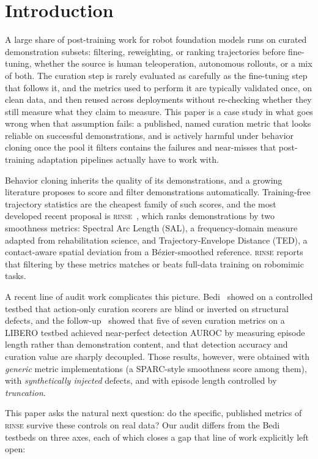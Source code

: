 \documentclass{article}
\newcommand{\rinse}{\textsc{rinse}}
\begin{document}
\section{Introduction}

A large share of post-training work for robot foundation models runs on
curated demonstration subsets: filtering, reweighting, or ranking
trajectories before fine-tuning, whether the source is human teleoperation,
autonomous rollouts, or a mix of both. The curation step is rarely evaluated
as carefully as the fine-tuning step that follows it, and the metrics used
to perform it are typically validated once, on clean data, and then reused
across deployments without re-checking whether they still measure what they
claim to measure. This paper is a case study in what goes wrong when that
assumption fails: a published, named curation metric that looks reliable on
successful demonstrations, and is actively harmful under behavior cloning
once the pool it filters contains the failures and near-misses that post-training adaptation
pipelines actually have to work with.

Behavior cloning inherits the quality of its demonstrations, and a growing
literature proposes to score and filter demonstrations automatically.
Training-free trajectory statistics are the cheapest family of such scores,
and the most developed recent proposal is \rinse{}~\citep{rinse}, which ranks
demonstrations by two smoothness metrics: Spectral Arc Length (SAL), a
frequency-domain measure adapted from rehabilitation science, and
Trajectory-Envelope Distance (TED), a contact-aware spatial deviation from a
B\'ezier-smoothed reference. \rinse{} reports that filtering by these metrics
matches or beats full-data training on robomimic tasks.

A recent line of audit work complicates this picture.
Bedi~\citep{bedi-audit} showed on a controlled testbed that action-only
curation scorers are blind or inverted on structural defects, and the
follow-up~\citep{bedi-policy} showed that five of seven curation metrics on a
LIBERO testbed achieved near-perfect detection AUROC by measuring episode
length rather than demonstration content, and that detection accuracy and
curation value are sharply decoupled. Those results, however, were obtained
with \emph{generic} metric implementations (a SPARC-style smoothness score
among them), with \emph{synthetically injected} defects, and with episode
length controlled by \emph{truncation}.

This paper asks the natural next question: do the specific, published metrics
of \rinse{} survive these controls on real data? Our audit differs from the
Bedi testbeds on three axes, each of which closes a gap that line of work
explicitly left open:
\end{document}
